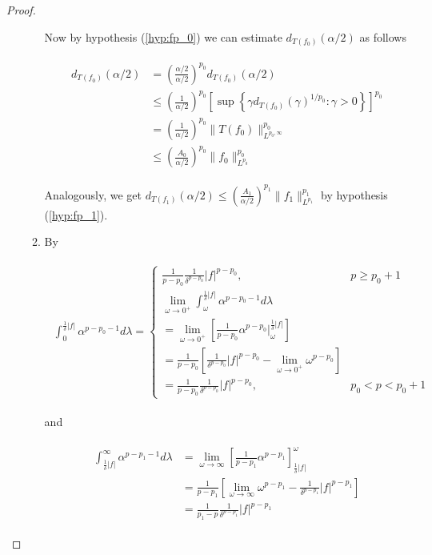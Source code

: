 \begin{proof}
\begin{enumerate}[label = \textbf{(\roman*.)}]
\begin{enumerate}[label = \textbf{\alph*.}]
Now by hypothesis (\ref{hyp:fp_0}) we can estimate $d_{T(f_0)}(\alpha/2)$ as follows

\begin{gather}
	\begin{aligned}
		d_{T(f_0)}(\alpha/2) &= \left(\frac{\alpha/2}{\alpha/2}\right)^{p_0} d_{T(f_0)}(\alpha/2)\\
		&\leqslant \left(\frac{1}{\alpha/2}\right)^{p_0} \left[\sup\left\{ \gamma d_{T(f_0)}(\gamma)^{1/p_0}: \gamma > 0\right\}\right]^{p_0}\\
	 & = \left(\frac{1}{\alpha/2}\right)^{p_0} \|T(f_0)\|^{p_0}_{L^{p_0,\infty}}\\
	 & \leqslant \left(\frac{A_0}{\alpha/2}\right)^{p_0} \|f_0\|^{p_0}_{L^{p_0}}
	\label{est:p_0}
	\end{aligned}
\end{gather}

Analogously, we get  $d_{T(f_1)}(\alpha/2) \leqslant \left(\frac{A_1}{\alpha/2}\right)^{p_1} \|f_1\|^{p_1}_{L^{p_1}}\label{est:p_1}$ by hypothesis (\ref{hyp:fp_1}).

	\item By

		\begin{gather}
			\begin{aligned}
				\int_0^{\frac{1}{\delta}\vert f\vert}\alpha^{p-p_0-1} d\lambda = 
				\begin{cases}
					\frac{1}{p-p_0}\frac{1}{\delta^{p-p_0}}\vert f \vert^{p - p_0}, & p \geqslant p_0 + 1\\
					\lim\limits_{\omega \rightarrow 0^+} \int_\omega^{\frac{1}{\delta}\vert f\vert}\alpha^{p-p_0-1} d\lambda\\
					= \lim\limits_{\omega \rightarrow 0^+}\left[\frac{1}{p-p_0}\alpha^{p - p_0}\big\vert_\omega^{\frac{1}{\delta}\vert f\vert}\right]\\
					= \frac{1}{p-p_0}\left[\frac{1}{\delta^{p-p_0}}\vert f \vert^{p - p_0} - \lim\limits_{\omega \rightarrow 0^+} \omega^{p-p_0}\right]\\
					= \frac{1}{p-p_0}\frac{1}{\delta^{p-p_0}} \vert f\vert^{p - p_0}, & p_0 < p < p_0 + 1
				\end{cases}
			\end{aligned}
		\end{gather}

		and

		\begin{gather}
			\begin{aligned}
				\int_{\frac{1}{\delta}\vert f\vert}^{\infty}\alpha^{p-p_1-1} d\lambda &= \lim_{\omega \rightarrow \infty} \left[ \frac{1}{p - p_1} \alpha^{p - p_1}\right]^\omega_{\frac{1}{\delta}\vert f\vert}\\
				&= \frac{1}{p - p_1} \left[  \lim_{\omega \rightarrow \infty} \omega^{p - p_1} - \frac{1}{\delta^{p - p_1}} \vert f\vert^{p - p_1}\right]\\
				&= \frac{1}{p_1 - p}\frac{1}{\delta^{p-p_1}} \vert f \vert^{p - p_1}
			\end{aligned}
		\end{gather}


\end{enumerate}
\end{enumerate}
\end{proof}
